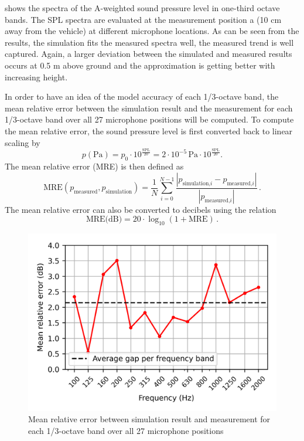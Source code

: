 \noindent{} shows the spectra of the A-weighted sound pressure level in one-third octave bands. The SPL spectra are evaluated at the measurement position a (10 cm away from the vehicle) at different microphone locations. As can be seen from the results, the simulation fits the measured spectra well, the measured trend is well captured. Again, a larger deviation between the simulated and measured results occurs at 0.5 m above ground and the approximation is getting better with increasing height.

In order to have an idea of the model accuracy of each 1/3-octave band, the mean relative error between the simulation result and the measurement for each 1/3-octave band over all 27 microphone positions will be computed. To compute the mean relative error, the sound pressure level is first converted back to linear scaling by
\begin{equation}
	p(\text{Pa}) = p_0 \cdot 10^{\frac{\text{SPL}}{20}} = 2\cdot10^{-5}\,\text{Pa} \cdot 10^{\frac{\text{SPL}}{20}}\text{.}
\end{equation}
The mean relative error (MRE) is then defined as
\begin{equation}
	\text{MRE}(p_{\text{measured}}, p_{\text{simulation}}) = \frac{1}{N} \sum_{i=0}^{N - 1} \frac{|p_{\text{simulation,}i} - p_{\text{measured,}i}|}{|p_{\text{measured,}i}|}\,.
\end{equation}
The mean relative error can also be converted to decibels using the relation
\begin{equation}
	\text{MRE(dB)} = 20\cdot\log_{10}(1 + \text{MRE})\,.
\end{equation}

\begin{figure}[H]
	\centering
	\includegraphics{fig/chap5/initial_model/freq_spectrum/average_gap.png}
	\caption{Mean relative error between simulation result and measurement for each 1/3-octave band over all 27 microphone positions}
	\label{fig:gap_freq_spectrum}
\end{figure}

